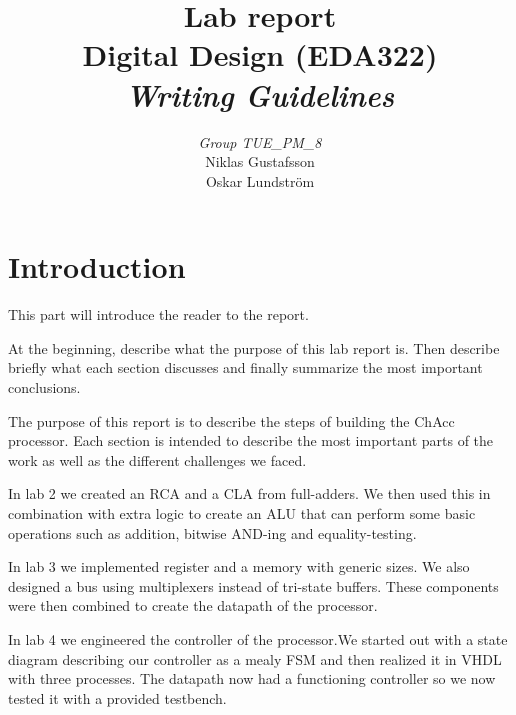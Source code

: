 \documentclass[a4paper,11pt]{article}
\begin{document}
\pagestyle{empty}
\begin{titlepage}

\title{\Huge{Lab report} \\[0.1cm] \Large{Digital Design (EDA322)} \\ [0.4cm] \Large{ \emph{Writing Guidelines}} \\[0.4cm]}
\author{\large{\emph{Group TUE\_PM\_8}} \\[0.2cm] Niklas Gustafsson \\[0.05cm] Oskar Lundström \\[0.1cm]}
\maketitle
\thispagestyle{empty}
\end{titlepage}
\clearpage
\pagestyle{fancyplain}
\tableofcontents
\clearpage
\setcounter{page}{1}
\section{Introduction}
This part will introduce the reader to the report. 

At the beginning, describe what the purpose of this lab report is. Then describe briefly what each section discusses and finally summarize the most important conclusions.

The purpose of this report is to describe the steps of building the ChAcc processor. Each section is intended to describe the most important parts of the work as well as the different challenges we faced.

In lab 2 we created an RCA and a CLA from full-adders. We then used this in combination with extra logic to create an ALU that can perform some basic operations such as addition, bitwise AND-ing and equality-testing.

In lab 3 we implemented register and a memory with generic sizes. We also designed a bus using multiplexers instead of tri-state buffers. These components were then combined to create the datapath of the processor.

In lab 4 we engineered the controller of the processor.We started out with a state diagram describing our controller as a mealy FSM and then realized it in VHDL with three processes. The datapath now had a functioning controller so we now tested it with a provided testbench.
\end{document}
